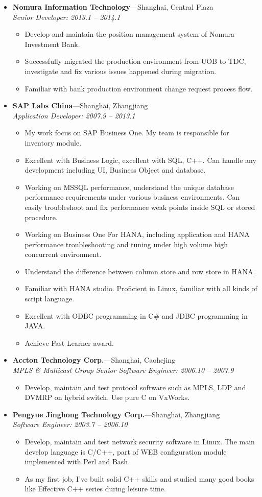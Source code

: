 \documentclass[11pt,oneside]{article}
\newenvironment{ressection}[1]{
    \vspace{4pt}
    \begin{itemize}
    \vspace{3pt}
}{
    \end{itemize}
}
\newcommand{\ressubitem}[1]{
    \vspace{-1pt}
    \item \begin{flushleft} #1 \end{flushleft}
}
\newcommand{\resbigitem}[3]{
    \vspace{-5pt}
    \item
    \textbf{#1}---#2 \\
    \textit{#3}
}
\newenvironment{ressubsec}[3]{
    \resbigitem{#1}{#2}{#3}
    \vspace{-2pt}
    \begin{itemize}
}{
    \end{itemize}
}
\begin{document}
\begin{ressection}{Experience}

	\begin{ressubsec}{Nomura Information Technology}{Shanghai, Central Plaza}{Senior Developer: 2013.1 -- 2014.1}
		\ressubitem{Develop and maintain the position management system of Nomura Investment Bank.}
		\ressubitem{Successfully migrated the production environment from UOB to TDC, investigate and fix various issues happened during migration.}
		\ressubitem{Familiar with bank production environment change request process flow.}
    \end{ressubsec}

    \begin{ressubsec}{SAP Labs China}{Shanghai, Zhangjiang}{Application Developer: 2007.9 -- 2013.1}
        \ressubitem{My work focus on SAP Business One. My team is responsible for inventory module.}
        \ressubitem{Excellent with Business Logic, excellent with SQL, C++. Can handle any development including UI, Business Object and database.}
        \ressubitem{Working on MSSQL performance, understand the unique database performance requirements under various business environments.
		Can easily troubleshoot and fix performance weak points inside SQL or stored procedure.}
		\ressubitem{Working on Business One For HANA, including application and HANA performance troubleshooting and tuning under high volume high concurrent environment.}
		\ressubitem{Understand the difference between column store and row store in HANA.}
        \ressubitem{Familiar with HANA studio. Proficient in Linux, familiar with all kinds of script language.}
        \ressubitem{Excellent with ODBC programming in C\# and JDBC programming in JAVA.}
		\ressubitem{Achieve Fast Learner award.}
    \end{ressubsec}

    \begin{ressubsec}{Accton Technology Corp.}{Shanghai, Caohejing}{MPLS \& Multicast Group Senior Software Engineer: 2006.10 -- 2007.9}
        \ressubitem{Develop, maintain and test protocol software such as MPLS, LDP and DVMRP on hybrid switch. Use pure C on VxWorks.}
    \end{ressubsec}

    \begin{ressubsec}{Pengyue Jinghong Technology Corp.}{Shanghai, Zhangjiang}{Software Engineer: 2003.7 -- 2006.10}
        \ressubitem{Develop, maintain and test network security software in Linux.
        The main develop language is C/C++, part of WEB configuration module implemented with Perl and Bash.}
        \ressubitem{As my first job, I've built solid C++ skills and
        studied many good books like Effective C++ series during leisure time.}
    \end{ressubsec}

\end{ressection}
\end{document}
